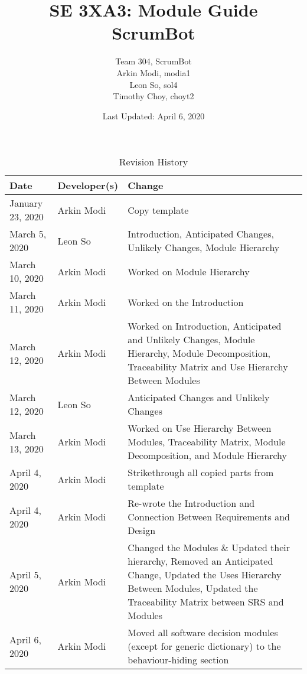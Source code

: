 \documentclass[12pt, titlepage]{article}
\title{SE 3XA3: Module Guide\\ScrumBot}
\author{
	Team 304, ScrumBot
		\\ Arkin Modi, modia1
        \\ Leon So, sol4
        \\ Timothy Choy, choyt2
}
\date{Last Updated: April 6, 2020}
\begin{document}
\maketitle

\tableofcontents
\listoftables
\listoffigures

\begin{table}[H]
    \caption{Revision History} \label{TblRevisionHistory}
    \begin{tabularx}{\textwidth}{llX}
        \toprule
            \textbf{Date} & \textbf{Developer(s)} & \textbf{Change}\\
        \midrule
            January 23, 2020 & Arkin Modi & Copy template\\
            March 5, 2020 & Leon So & Introduction, Anticipated Changes, Unlikely Changes, Module Hierarchy\\
            March 10, 2020 & Arkin Modi & Worked on Module Hierarchy\\
            March 11, 2020 & Arkin Modi & Worked on the Introduction\\
            March 12, 2020 & Arkin Modi & Worked on Introduction, Anticipated and Unlikely Changes, Module Hierarchy, Module Decomposition, Traceability Matrix and Use Hierarchy Between Modules\\
            March 12, 2020 & Leon So & Anticipated Changes and Unlikely Changes\\
            March 13, 2020 & Arkin Modi & Worked on Use Hierarchy Between Modules, Traceability Matrix, Module Decomposition, and Module Hierarchy\\
            April 4, 2020 & Arkin Modi & Strikethrough all copied parts from template\\
            April 4, 2020 & Arkin Modi & Re-wrote the Introduction and Connection Between Requirements and Design\\
            April 5, 2020 & Arkin Modi & Changed the Modules \& Updated their hierarchy, Removed an Anticipated Change, Updated the Uses Hierarchy Between Modules, Updated the Traceability Matrix between SRS and Modules\\
            April 6, 2020 & Arkin Modi & Moved all software decision modules (except for generic dictionary) to the behaviour-hiding section\\
        \bottomrule
    \end{tabularx}
\end{table}

\newpage
\end{document}
